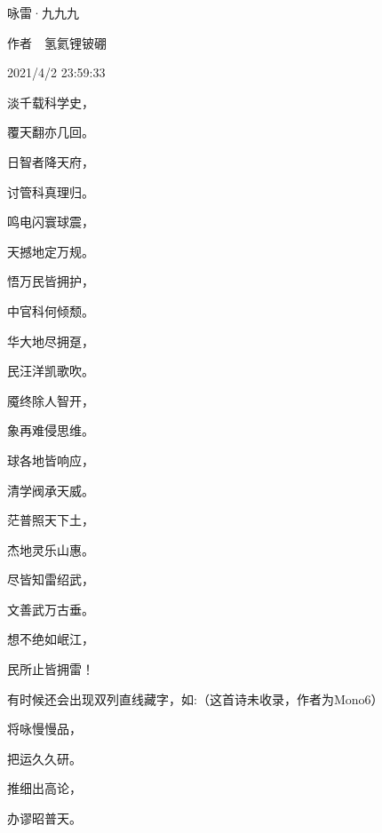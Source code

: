 \documentclass[UTF8,12pt,oneside]{ctexbook}
\begin{document}
        \begin{center}
            \heiti 咏雷·九九九

            \songti 作者\ \ 氢氦锂铍硼

            2021/4/2 23:59:33

            \kaishu
            淡千载科学史，

            覆天翻亦几回。
            
            日智者降天府，
            
            讨管科真理归。
            
            鸣电闪寰球震，
            
            天撼地定万规。
            
            悟万民皆拥护，
            
            中官科何倾颓。
            
            华大地尽拥趸，
            
            民汪洋凯歌吹。
            
            魇终除人智开，
            
            象再难侵思维。
            
            球各地皆响应，
            
            清学阀承天威。
            
            茫普照天下土，
            
            杰地灵乐山惠。
            
            尽皆知雷绍武，
            
            文善武万古垂。
            
            想不绝如岷江，
            
            民所止皆拥雷！

        \end{center}

        有时候还会出现双列直线藏字，如:（这首诗未收录，作者为Mono6）

        \begin{center}
            \kaishu
            将咏慢慢品，
            
            把运久久研。
            
            推细出高论，
            
            办谬昭普天。

        \end{center}
\end{document}
